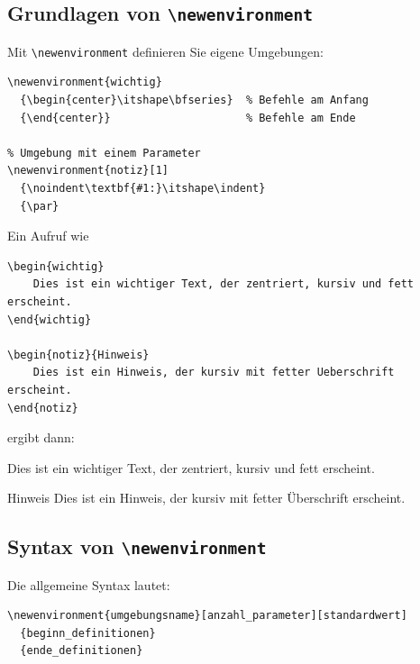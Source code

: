 \subsection{Grundlagen von \texttt{\textbackslash newenvironment}}

Mit \texttt{\textbackslash newenvironment} definieren Sie eigene Umgebungen:

\begin{lstlisting}[style=latex]
% Einfache Umgebung ohne Parameter
\newenvironment{wichtig}
  {\begin{center}\itshape\bfseries}  % Befehle am Anfang
  {\end{center}}                     % Befehle am Ende

% Umgebung mit einem Parameter
\newenvironment{notiz}[1]
  {\noindent\textbf{#1:}\itshape\indent}
  {\par}
\end{lstlisting}
Ein Aufruf wie
\begin{lstlisting}[style=latex]
\begin{wichtig}
	Dies ist ein wichtiger Text, der zentriert, kursiv und fett erscheint.
\end{wichtig}

\begin{notiz}{Hinweis}
	Dies ist ein Hinweis, der kursiv mit fetter Ueberschrift erscheint.
\end{notiz}
\end{lstlisting}
ergibt dann:
\begin{ausgabe}
\begin{wichtig}
Dies ist ein wichtiger Text, der zentriert, kursiv und fett erscheint.
\end{wichtig}

\begin{notiz}{Hinweis}
Dies ist ein Hinweis, der kursiv mit fetter Überschrift erscheint.
\end{notiz}
\end{ausgabe}



\subsection{Syntax von \texttt{\textbackslash newenvironment}}

Die allgemeine Syntax lautet:

\begin{lstlisting}[style=latex]
\newenvironment{umgebungsname}[anzahl_parameter][standardwert]
  {beginn_definitionen}
  {ende_definitionen}
\end{lstlisting}

